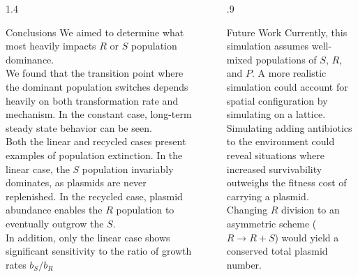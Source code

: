 \documentclass[final]{beamer}
\newlength{\sepwid}
\newlength{\onecolwid}
\begin{document}
\begin{frame}[t]
\begin{block}
\begin{columns}[t]
\begin{column}{1.4\onecolwid}
  \begin{alertblock}{Conclusions}
    We aimed to determine what most heavily impacts $R$ or $S$ population dominance. \\
    \quad\quad We found that the transition point where the dominant population switches
    depends heavily on both transformation rate and mechanism. In the constant case,
    long-term steady state behavior can be seen.\\
    \quad\quad Both the linear and recycled cases present examples of population
    extinction. In the linear case, the $S$ population invariably dominates,
    as plasmids are never replenished. In the recycled case, plasmid
    abundance enables the $R$ population to eventually outgrow the $S$.\\
    \quad\quad In addition, only the linear case shows significant sensitivity
    to the ratio of growth rates $b_S/b_R$

  \end{alertblock}
\end{column}

\begin{column}{\sepwid}\end{column} %

\begin{column}{.9\onecolwid}
  \begin{alertblock}{Future Work}
    Currently, this simulation assumes well-mixed populations of $S$, $R$, and $P$.
    A more realistic simulation could account for spatial configuration by simulating on a lattice.\\
    \quad\quad Simulating adding antibiotics to the environment could reveal situations
    where increased survivability outweighs the fitness cost of carrying a plasmid. \\
    \quad Changing $R$ division to an asymmetric scheme ($R \rightarrow R + S$) would
    yield a conserved total plasmid number.


\end{alertblock}
\end{column}
\end{columns}
\end{block}
\end{frame}
\end{document}
